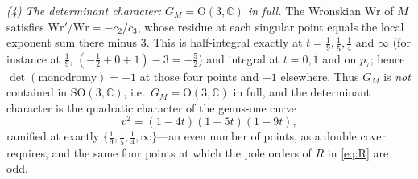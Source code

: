\documentclass[cntp]{ipart}
\theoremstyle{plain}
\theoremstyle{remark}
\begin{document}
\emph{(4) The determinant character: $G_M=\mathrm{O}(3,\mathbb{C})$ in full.} The Wronskian $\mathrm{Wr}$ of $M$ satisfies
$\mathrm{Wr}'/\mathrm{Wr}=-c_2/c_3$, whose residue at each singular point equals the local exponent sum there minus $3$. This is
half-integral exactly at $t=\tfrac19,\tfrac15,\tfrac14$ and $\infty$ (for instance at $\tfrac19$,
$(-\tfrac12+0+1)-3=-\tfrac52$) and integral at $t=0,1$ and on $p_7$; hence $\det(\text{monodromy})=-1$ at those
four points and $+1$ elsewhere. Thus $G_M$ is \emph{not} contained in $\mathrm{SO}(3,\mathbb{C})$, i.e.\
$G_M=\mathrm{O}(3,\mathbb{C})$ in full, and the determinant character is the quadratic character of the genus-one
curve
\begin{equation}
v^2=(1-4t)(1-5t)(1-9t),
\label{eq:twist}
\end{equation}
ramified at exactly $\{\tfrac19,\tfrac15,\tfrac14,\infty\}$---an even number of points, as a double cover requires,
and the same four points at which the pole orders of $R$ in \eqref{eq:R} are odd.
\end{document}
